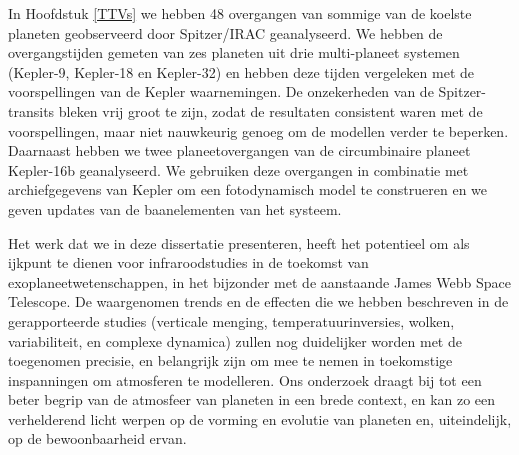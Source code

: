 In Hoofdstuk \ref{TTVs} we hebben 48 overgangen van sommige van de koelste planeten geobserveerd door Spitzer/IRAC geanalyseerd. We hebben de overgangstijden gemeten van zes planeten uit drie multi-planeet systemen (Kepler-9, Kepler-18 en Kepler-32) en hebben deze tijden vergeleken met de voorspellingen van de Kepler waarnemingen. De onzekerheden van de Spitzer-transits bleken vrij groot te zijn, zodat de resultaten consistent waren met de voorspellingen, maar niet nauwkeurig genoeg om de modellen verder te beperken. Daarnaast hebben we twee planeetovergangen van de circumbinaire planeet Kepler-16b geanalyseerd. We gebruiken deze overgangen in combinatie met archiefgegevens van Kepler om een fotodynamisch model te construeren en we geven updates van de baanelementen van het systeem.

Het werk dat we in deze dissertatie presenteren, heeft het potentieel om als ijkpunt te dienen voor infraroodstudies in de toekomst van exoplaneetwetenschappen, in het bijzonder met de aanstaande James Webb Space Telescope. De waargenomen trends en de effecten die we hebben beschreven in de gerapporteerde studies (verticale menging, temperatuurinversies, wolken, variabiliteit, en complexe dynamica) zullen nog duidelijker worden met de toegenomen precisie, en belangrijk zijn om mee te nemen in toekomstige inspanningen om atmosferen te modelleren. Ons onderzoek draagt bij tot een beter begrip van de atmosfeer van planeten in een brede context, en kan zo een verhelderend licht werpen op de vorming en evolutie van planeten en, uiteindelijk, op de bewoonbaarheid ervan.



\renewcommand\chapterautorefname{chapter}%


